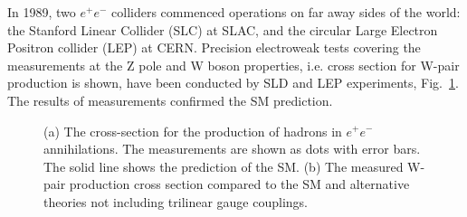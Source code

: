 In 1989, two $e^+e^-$ colliders commenced operations on far away sides of the world:
the Stanford Linear Collider (SLC) at SLAC,  and the circular Large Electron
Positron collider (LEP) at CERN. Precision electroweak tests covering the measurements at the Z pole and W boson properties, i.e. cross section for W-pair production is shown, have been conducted by SLD and LEP experiments, Fig.~\ref{alt}. The results of measurements confirmed the SM prediction. 
\begin{figure}
\centering%
\caption{(a) The cross-section for the production of hadrons in $e^+e^-$ annihilations. The measurements are shown as dots with error bars. The solid line shows the prediction of the SM. (b) The measured W-pair production cross section compared to the SM and alternative
theories not including trilinear gauge couplings.}
\label{alt}
\end{figure}
